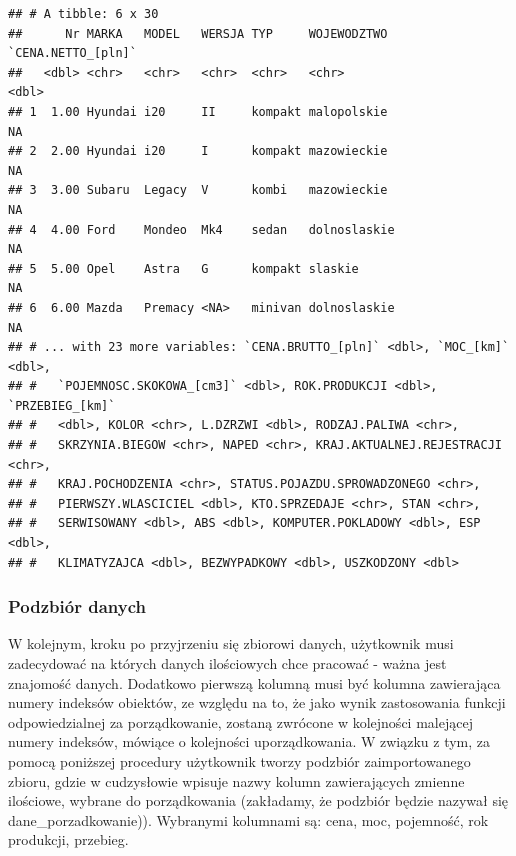 \documentclass[12pt,a4paper]{report}
\begin{document}
{\begin{verbatim}
## # A tibble: 6 x 30
##      Nr MARKA   MODEL   WERSJA TYP     WOJEWODZTWO  `CENA.NETTO_[pln]`
##   <dbl> <chr>   <chr>   <chr>  <chr>   <chr>                     <dbl>
## 1  1.00 Hyundai i20     II     kompakt malopolskie                  NA
## 2  2.00 Hyundai i20     I      kompakt mazowieckie                  NA
## 3  3.00 Subaru  Legacy  V      kombi   mazowieckie                  NA
## 4  4.00 Ford    Mondeo  Mk4    sedan   dolnoslaskie                 NA
## 5  5.00 Opel    Astra   G      kompakt slaskie                      NA
## 6  6.00 Mazda   Premacy <NA>   minivan dolnoslaskie                 NA
## # ... with 23 more variables: `CENA.BRUTTO_[pln]` <dbl>, `MOC_[km]` <dbl>,
## #   `POJEMNOSC.SKOKOWA_[cm3]` <dbl>, ROK.PRODUKCJI <dbl>, `PRZEBIEG_[km]`
## #   <dbl>, KOLOR <chr>, L.DZRZWI <dbl>, RODZAJ.PALIWA <chr>,
## #   SKRZYNIA.BIEGOW <chr>, NAPED <chr>, KRAJ.AKTUALNEJ.REJESTRACJI <chr>,
## #   KRAJ.POCHODZENIA <chr>, STATUS.POJAZDU.SPROWADZONEGO <chr>,
## #   PIERWSZY.WLASCICIEL <dbl>, KTO.SPRZEDAJE <chr>, STAN <chr>,
## #   SERWISOWANY <dbl>, ABS <dbl>, KOMPUTER.POKLADOWY <dbl>, ESP <dbl>,
## #   KLIMATYZAJCA <dbl>, BEZWYPADKOWY <dbl>, USZKODZONY <dbl>
\end{verbatim}

\subsubsection{Podzbiór danych}\label{podzbior-danych}

W kolejnym, kroku po przyjrzeniu się zbiorowi danych, użytkownik musi
zadecydować na których danych ilościowych chce pracować - ważna jest
znajomość danych. Dodatkowo pierwszą kolumną musi być kolumna
zawierająca numery indeksów obiektów, ze względu na to, że jako wynik
zastosowania funkcji odpowiedzialnej za porządkowanie, zostaną zwrócone
w kolejności malejącej numery indeksów, mówiące o kolejności
uporządkowania. W związku z tym, za pomocą poniższej procedury
użytkownik tworzy podzbiór zaimportowanego zbioru, gdzie w cudzysłowie
wpisuje nazwy kolumn zawierających zmienne ilościowe, wybrane do
porządkowania (zakładamy, że podzbiór będzie nazywał się
dane\_porzadkowanie)). Wybranymi kolumnami są: cena, moc, pojemność, rok produkcji,
przebieg.

\begin{Shaded}
\begin{Highlighting}[]
\NormalTok{dane_porzadkowanie<-zbior_danych[}\NormalTok{(}\NormalTok{,}\NormalTok{,}\NormalTok{,}
                                   \NormalTok{,}
                                  \NormalTok{,}\NormalTok{)]}
\end{Highlighting}
\end{Shaded}

}
\end{document}

